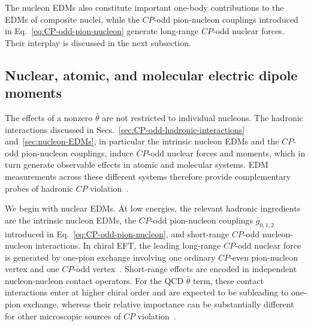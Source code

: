 \documentclass[review]{elsarticle}
\numberwithin{equation}{section}
\numberwithin{table}{section}
\numberwithin{figure}{section}
\begin{document}
The nucleon EDMs also constitute important one-body contributions to the EDMs of composite nuclei, while the $CP$-odd pion-nucleon couplings introduced in Eq.~\eqref{eq:CP-odd-pion-nucleon} generate long-range $CP$-odd nuclear forces. Their interplay is discussed in the next subsection.

\subsection{Nuclear, atomic, and molecular electric dipole moments}
\label{sec:nuclear-atomic-molecular-EDMs}

The effects of a nonzero $\bar\theta$ are not restricted to individual nucleons. The hadronic interactions discussed in Secs.~\ref{sec:CP-odd-hadronic-interactions} and~\ref{sec:nucleon-EDMs}, in particular the intrinsic nucleon EDMs and the $CP$-odd pion-nucleon couplings, induce $CP$-odd nuclear forces and moments, which in turn generate observable effects in atomic and molecular systems. EDM measurements across these different systems therefore provide complementary probes of hadronic $CP$ violation~\cite{Engel:2013lsa,Yamanaka:2016umw,Chupp:2017rkp,Safronova:2017xyt,Engel:2025uci,deVries:2026quu}.

We begin with nuclear EDMs. At low energies, the relevant hadronic ingredients are the intrinsic nucleon EDMs, the $CP$-odd pion-nucleon couplings $\bar g_{0,1,2}$ introduced in Eq.~\eqref{eq:CP-odd-pion-nucleon}, and short-range $CP$-odd nucleon-nucleon interactions. In chiral EFT, the leading long-range $CP$-odd nuclear force is generated by one-pion exchange involving one ordinary $CP$-even pion-nucleon vertex and one $CP$-odd vertex~\cite{Mereghetti:2010tp,deVries:2012ab,Bsaisou:2014oka}. Short-range effects are encoded in independent nucleon-nucleon contact operators. For the QCD $\bar\theta$ term, these contact interactions enter at higher chiral order and are expected to be subleading to one-pion exchange, whereas their relative importance can be substantially different for other microscopic sources of $CP$ violation~\cite{deVries:2012ab,Bsaisou:2014oka,deVries:2015una}.
\end{document}
